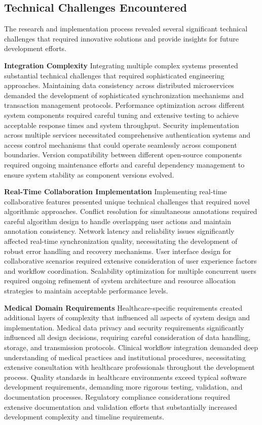 \subsection{Technical Challenges Encountered}

The research and implementation process revealed several significant technical challenges that required innovative solutions and provide insights for future development efforts.

\textbf{Integration Complexity}
Integrating multiple complex systems presented substantial technical challenges that required sophisticated engineering approaches. Maintaining data consistency across distributed microservices demanded the development of sophisticated synchronization mechanisms and transaction management protocols. Performance optimization across different system components required careful tuning and extensive testing to achieve acceptable response times and system throughput. Security implementation across multiple services necessitated comprehensive authentication systems and access control mechanisms that could operate seamlessly across component boundaries. Version compatibility between different open-source components required ongoing maintenance efforts and careful dependency management to ensure system stability as component versions evolved.

\textbf{Real-Time Collaboration Implementation}
Implementing real-time collaborative features presented unique technical challenges that required novel algorithmic approaches. Conflict resolution for simultaneous annotations required careful algorithm design to handle overlapping user actions and maintain annotation consistency. Network latency and reliability issues significantly affected real-time synchronization quality, necessitating the development of robust error handling and recovery mechanisms. User interface design for collaborative scenarios required extensive consideration of user experience factors and workflow coordination. Scalability optimization for multiple concurrent users required ongoing refinement of system architecture and resource allocation strategies to maintain acceptable performance levels.

\textbf{Medical Domain Requirements}
Healthcare-specific requirements created additional layers of complexity that influenced all aspects of system design and implementation. Medical data privacy and security requirements significantly influenced all design decisions, requiring careful consideration of data handling, storage, and transmission protocols. Clinical workflow integration demanded deep understanding of medical practices and institutional procedures, necessitating extensive consultation with healthcare professionals throughout the development process. Quality standards in healthcare environments exceed typical software development requirements, demanding more rigorous testing, validation, and documentation processes. Regulatory compliance considerations required extensive documentation and validation efforts that substantially increased development complexity and timeline requirements.

